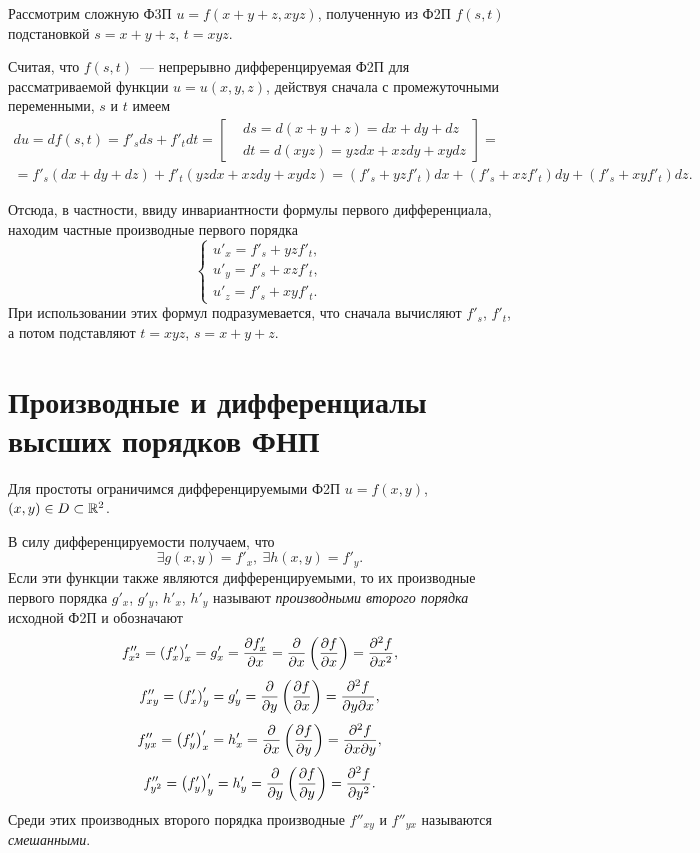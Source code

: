 \documentclass[../../main.tex]{subfiles}
\begin{document}
	\begin{exmp}
		Рассмотрим сложную Ф3П $u=f(x+y+z,xyz)$, полученную из Ф2П $f(s,t)$ 
		подстановкой $s=x+y+z$, $t=xyz$.
		
		Считая, что $f(s,t)$~--- непрерывно дифференцируемая Ф2П для рассматриваемой 
		функции $u=u(x,y,z)$, действуя сначала с промежуточными переменными, $s$ и $t$ имеем
		\begin{gather*}
			du = df(s,t) = f'_sds + f'_tdt = \left[\begin{aligned}
				& ds = d(x + y + z) = dx + dy + dz\\
				& dt = d(xyz) = yzdx + xzdy + xydz
			\end{aligned}\right] = \\
			= f'_s\left(dx + dy + dz\right) + 
			f'_t\left(yzdx + xzdy + xydz\right) = 
			\left(f'_s + yzf'_t\right)dx + 
			\left(f'_s + xzf'_t\right)dy + 
			\left(f'_s + xyf'_t\right)dz.
		\end{gather*}
		
		Отсюда, в частности, ввиду инвариантности формулы первого 
		дифференциала, находим частные производные первого порядка
		\[\begin{cases}
			u'_x = f'_s + yzf'_t,\\
			u'_y = f'_s + xzf'_t,\\
			u'_z = f'_s + xyf'_t.
		\end{cases}\]
		При использовании этих формул подразумевается, что сначала 
		вычисляют $f'_s$, $f'_t$, а потом подставляют 
		$t = xyz$, $s = x + y + z$.
	\end{exmp}

	\section{Производные и дифференциалы высших порядков ФНП}
	
	Для простоты ограничимся дифференцируемыми Ф2П $u=f(x,y)$, $(x,y)\in 
	D\subset \mathbb{R}^2$.
	
	В силу дифференцируемости получаем, что
	\[\exists g(x,y) = f'_x,\ \exists h(x,y) = f'_y.\]
	Если эти функции также являются дифференцируемыми, то их производные 
	первого порядка $g'_x$, $g'_y$, $h'_x$, $h'_y$ называют \emph{производными 
	второго порядка} исходной Ф2П и обозначают 
	\[f''_{x^2} = \left(f'_x\right)'_x = g'_x = \frac{\partial f'_x}{\partial x} =
	 \frac{\partial }{\partial x}\left(\frac{\partial f}{\partial x}\right) = \frac{\partial ^2f}{\partial x^2},\]
	\[f''_{xy} = \left(f'_x\right)'_y = g'_y = 
	\frac{\partial }{\partial y}\left(\frac{\partial f}{\partial x}\right) = \frac{\partial ^2f}{\partial y\partial x},\]
	\[f''_{yx} = \left(f'_y\right)'_x = h'_x = 
	\frac{\partial }{\partial x}\left(\frac{\partial f}{\partial y}\right) = \frac{\partial ^2f}{\partial x\partial y},\]
	\[f''_{y^2} = \left(f'_y\right)'_y = h'_y = 
	\frac{\partial }{\partial y}\left(\frac{\partial f}{\partial y}\right) = \frac{\partial ^2f}{\partial y^2}.\]
	Среди этих производных второго порядка производные $f''_{xy}$ и 
	$f''_{yx}$ называются \emph{смешанными}.
	
\end{document}
